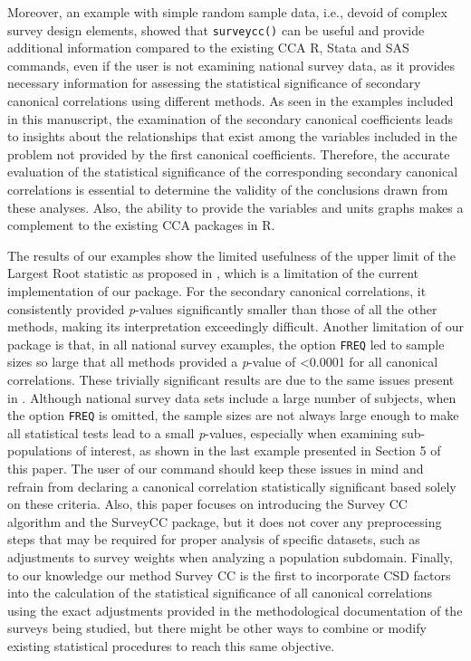 Moreover, an example with simple random sample data, i.e., devoid of complex survey design elements, showed that \texttt{surveycc()} can be useful and provide additional information compared to the existing CCA R, Stata and SAS commands, even if the user is not examining national survey data, as it provides necessary information for assessing the statistical significance of secondary canonical correlations using different methods. As seen in the examples included in this manuscript, the examination of the secondary canonical coefficients leads to insights about the relationships that exist among the variables included in the problem not provided by the first canonical coefficients. Therefore, the accurate evaluation of the statistical significance of the corresponding secondary canonical correlations is essential to determine the validity of the conclusions drawn from these analyses. Also, the ability to provide the variables and units graphs makes  a complement to the existing CCA packages in R.

The results of our examples show the limited usefulness of the upper limit of the Largest Root statistic as proposed in \citep{johnstone2009}, which is a limitation of the current implementation of our package. For the secondary canonical correlations, it consistently provided \emph{p}-values significantly smaller than those of all the other methods, making its interpretation exceedingly difficult. Another limitation of our package is that, in all national survey examples, the option \texttt{FREQ} led to sample sizes so large that all methods provided a \emph{p}-value of \textless0.0001 for all canonical correlations. These trivially significant results are due to the same issues present in \citep{Nelson2020SURVEYCORRCOVMC}. Although national survey data sets include a large number of subjects, when the option \texttt{FREQ} is omitted, the sample sizes are not always large enough to make all statistical tests lead to a small \emph{p}-values, especially when examining sub-populations of interest, as shown in the last example presented in Section 5 of this paper. The user of our command should keep these issues in mind and refrain from declaring a canonical correlation statistically significant based solely on these criteria. Also, this paper focuses on introducing the Survey CC algorithm and the SurveyCC package, but it does not cover any preprocessing steps that may be required for proper analysis of specific datasets, such as adjustments to survey weights when analyzing a population subdomain. Finally, to our knowledge our method Survey CC is the first to incorporate CSD factors into the calculation of the statistical significance of all canonical correlations using the exact adjustments provided in the methodological documentation of the surveys being studied, but there might be other ways to combine or modify existing statistical procedures to reach this same objective.

